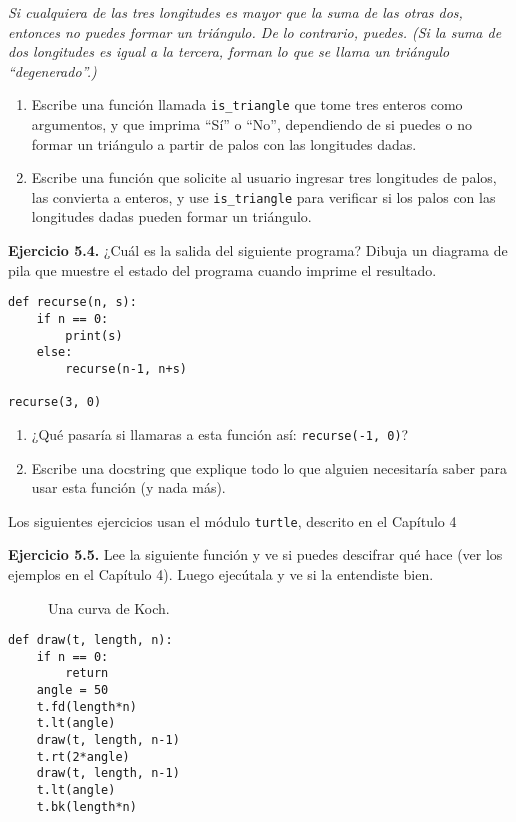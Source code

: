 \emph{Si cualquiera de las tres longitudes es mayor que la suma de las otras dos, entonces no puedes formar un triángulo. De lo contrario, puedes. (Si la suma de dos longitudes es igual a la tercera, forman lo que se llama un triángulo ``degenerado''.)}

\begin{enumerate}
\item Escribe una función llamada \texttt{is\_triangle} que tome tres enteros como argumentos, y que imprima ``Sí'' o ``No'', dependiendo de si puedes o no formar un triángulo a partir de palos con las longitudes dadas.

\item Escribe una función que solicite al usuario ingresar tres longitudes de palos, las convierta a enteros, y use \texttt{is\_triangle} para verificar si los palos con las longitudes dadas pueden formar un triángulo.
\end{enumerate}

\textbf{Ejercicio 5.4.} ¿Cuál es la salida del siguiente programa? Dibuja un diagrama de pila que muestre el estado del programa cuando imprime el resultado.

\begin{verbatim}
def recurse(n, s):
    if n == 0:
        print(s)
    else:
        recurse(n-1, n+s)

recurse(3, 0)
\end{verbatim}

\begin{enumerate}
\item ¿Qué pasaría si llamaras a esta función así: \texttt{recurse(-1, 0)}?

\item Escribe una docstring que explique todo lo que alguien necesitaría saber para usar esta función (y nada más).
\end{enumerate}

Los siguientes ejercicios usan el módulo \texttt{turtle}, descrito en el Capítulo 4

\textbf{Ejercicio 5.5.} Lee la siguiente función y ve si puedes descifrar qué hace (ver los ejemplos en el Capítulo 4). Luego ejecútala y ve si la entendiste bien.

\begin{figure}[h]
\centering
\caption{Una curva de Koch.}
\label{fig:koch}
\end{figure}

\begin{verbatim}
def draw(t, length, n):
    if n == 0:
        return
    angle = 50
    t.fd(length*n)
    t.lt(angle)
    draw(t, length, n-1)
    t.rt(2*angle)
    draw(t, length, n-1)
    t.lt(angle)
    t.bk(length*n)
\end{verbatim}

